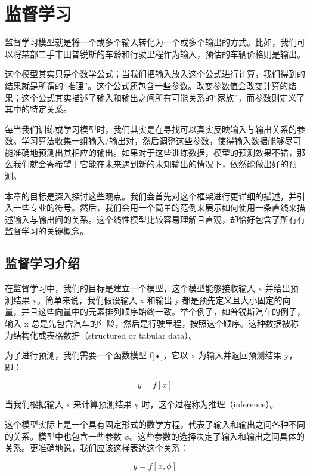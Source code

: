 \chapter{监督学习}

监督学习模型就是将一个或多个输入转化为一个或多个输出的方式。比如，我们可以将某部二手丰田普锐斯的车龄和行驶里程作为输入，预估的车辆价格则是输出。

这个模型其实只是个数学公式；当我们把输入放入这个公式进行计算，我们得到的结果就是所谓的“推理”。这个公式还包含一些参数。改变参数值会改变计算的结果；这个公式其实描述了输入和输出之间所有可能关系的“家族”，而参数则定义了其中的特定关系。

每当我们训练或学习模型时，我们其实是在寻找可以真实反映输入与输出关系的参数。学习算法收集一组输入/输出对，然后调整这些参数，使得输入数据能够尽可能准确地预测出其相应的输出。如果对于这些训练数据，模型的预测效果不错，那么我们就会寄希望于它能在未来遇到新的未知输出的情况下，依然能做出好的预测。

本章的目标是深入探讨这些观点。我们会首先对这个框架进行更详细的描述，并引入一些专业的符号。然后，我们会用一个简单的范例来展示如何使用一条直线来描述输入与输出间的关系。这个线性模型比较容易理解且直观，却恰好包含了所有有监督学习的关键概念。

\section{监督学习介绍}

在监督学习中，我们的目标是建立一个模型，这个模型能够接收输入 x 并给出预测结果 y。简单来说，我们假设输入 x 和输出 y 都是预先定义且大小固定的向量，并且这些向量中的元素排列顺序始终一致。举个例子，如普锐斯汽车的例子，输入 x 总是先包含汽车的年龄，然后是行驶里程，按照这个顺序。这种数据被称为结构化或表格数据（structured or tabular data）。

为了进行预测，我们需要一个函数模型 f[•]，它以 x 为输入并返回预测结果 y，即：

\begin{equation}
y = f[x] 
\end{equation}

当我们根据输入 x 来计算预测结果 y 时，这个过程称为推理（inference）。

这个模型实际上是一个具有固定形式的数学方程，代表了输入和输出之间各种不同的关系。模型中也包含一些参数 $\phi$。这些参数的选择决定了输入和输出之间具体的关系。更准确地说，我们应该这样表达这个关系：

\begin{equation}
y = f[x, \phi] 
\end{equation}

